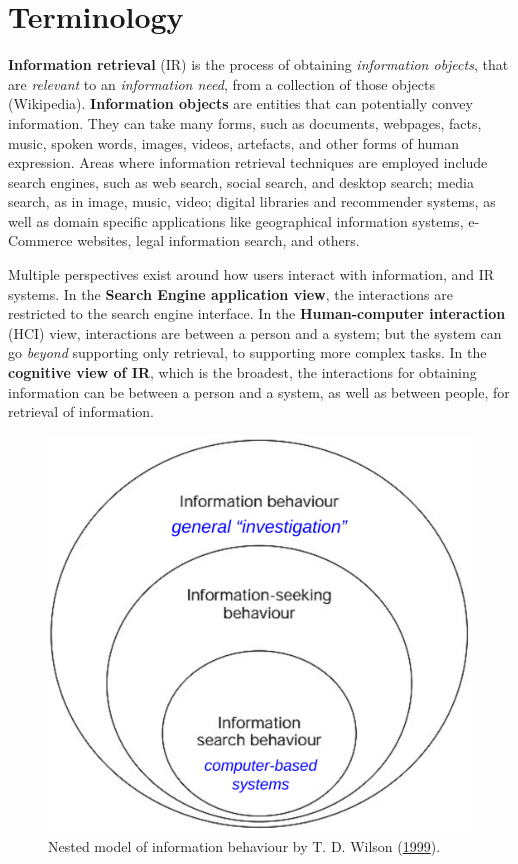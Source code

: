 \documentclass[letterpaper, nobind]{templates/ociamthesis}
\begin{document}
\hypertarget{sec-bg-search-terminology}{%
\section{Terminology}\label{sec-bg-search-terminology}}

\textbf{Information retrieval} (IR) is the process of obtaining \emph{information
objects}, that are \emph{relevant} to an \emph{information need}, from a
collection of those objects (Wikipedia). \textbf{Information objects} are
entities that can potentially convey information. They can take many
forms, such as documents, webpages, facts, music, spoken words, images,
videos, artefacts, and other forms of human expression. Areas where
information retrieval techniques are employed include search engines,
such as web search, social search, and desktop search; media search, as
in image, music, video; digital libraries and recommender systems, as
well as domain specific applications like geographical information
systems, e-Commerce websites, legal information search, and others.

Multiple perspectives exist around how users interact with information,
and IR systems. In the \textbf{Search Engine application view}, the
interactions are restricted to the search engine interface. In the
\textbf{Human-computer interaction} (HCI) view, interactions are between a
person and a system; but the system can go \emph{beyond} supporting only
retrieval, to supporting more complex tasks. In the \textbf{cognitive view of
IR}, which is the broadest, the interactions for obtaining information
can be between a person and a system, as well as between people, for
retrieval of information.

\begin{figure}

{\centering \includegraphics[width=0.5\linewidth]{figs/wilson-info-behaviour} 

}

\caption[Nested model of information behaviour by T. D. Wilson (\protect\hyperlink{ref-wilson1999models}{1999}).]{Nested model of information behaviour by T. D. Wilson (\protect\hyperlink{ref-wilson1999models}{1999}).}\label{fig:wilson-info-behaviour}
\end{figure}
\end{document}
